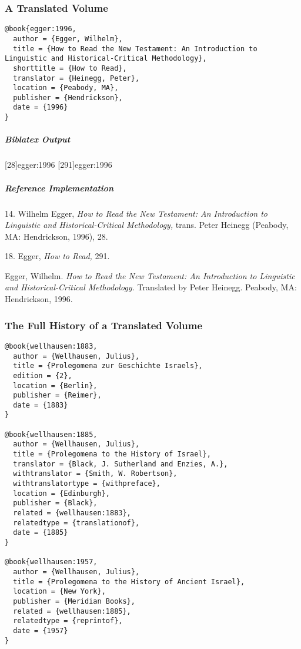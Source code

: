\documentclass[a4paper]{article}
\newenvironment{biboutput}{%
  \subparagraph{Biblatex Output}
}{\color{black}}
\newenvironment{refimp}{%
  \subparagraph{Reference Implementation}
  \color{reference-colour}
  \rm
}{\par\color{black}}
\begin{document}
\subsubsection{A Translated Volume}

\begin{lstlisting}
@book{egger:1996,
  author = {Egger, Wilhelm},
  title = {How to Read the New Testament: An Introduction to Linguistic and Historical-Critical Methodology},
  shorttitle = {How to Read},
  translator = {Heinegg, Peter},
  location = {Peabody, MA},
  publisher = {Hendrickson},
  date = {1996}
}
\end{lstlisting}  

\begin{biboutput}
  [28]{egger:1996}
  [291]{egger:1996}
\end{biboutput}

\begin{refimp}
  14. Wilhelm Egger, \emph{How to Read the New Testament: An Introduction to
  Linguistic and Historical-Critical Methodology,} trans. Peter Heinegg
  (Peabody, MA: Hendrickson, 1996), 28.

  18. Egger, \emph{How to Read,} 291.
  
  \hangindent\bibindent Egger, Wilhelm. \emph{How to Read the New Testament:
  An Introduction to Linguistic and Historical-Critical Methodology.}
  Translated by Peter Heinegg. Peabody, MA: Hendrickson, 1996.
\end{refimp}

\subsubsection{The Full History of a Translated Volume}

\begin{lstlisting}
@book{wellhausen:1883,
  author = {Wellhausen, Julius},
  title = {Prolegomena zur Geschichte Israels},
  edition = {2},
  location = {Berlin},
  publisher = {Reimer},
  date = {1883}
}

@book{wellhausen:1885,
  author = {Wellhausen, Julius},
  title = {Prolegomena to the History of Israel},
  translator = {Black, J. Sutherland and Enzies, A.},
  withtranslator = {Smith, W. Robertson},
  withtranslatortype = {withpreface},
  location = {Edinburgh},
  publisher = {Black},
  related = {wellhausen:1883},
  relatedtype = {translationof},
  date = {1885}
}

@book{wellhausen:1957,
  author = {Wellhausen, Julius},
  title = {Prolegomena to the History of Ancient Israel},
  location = {New York},
  publisher = {Meridian Books},
  related = {wellhausen:1885},
  relatedtype = {reprintof},
  date = {1957}
}
\end{lstlisting}
\end{document}
